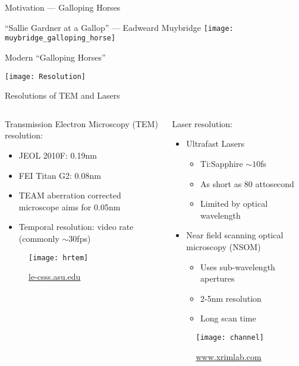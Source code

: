 \begin{frame}{Motivation --- Galloping Horses}
  \begin{center}
    ``Sallie Gardner at a Gallop'' --- Eadweard Muybridge
    \texttt{[image: muybridge\_galloping\_horse]}
  \end{center}
\end{frame}

\begin{frame}{Modern ``Galloping Horses''}
  \begin{center}
    \texttt{[image: Resolution]}
  \end{center}
\end{frame}

\begin{frame}{Resolutions of TEM and Lasers}
  \begin{columns}	
    \begin{column}{0.49\linewidth}
      Transmission Electron Microscopy (TEM) resolution:
      \begin{itemize}
        \item<2-> JEOL 2010F: 0.19nm
        \item<3-> FEI Titan G2: 0.08nm
        \item<4-> TEAM aberration corrected microscope aims for 0.05nm
        \item<5-> Temporal resolution: video rate (commonly $\sim$30fps)
      \end{itemize}
      \begin{figure}
        \centering
        \texttt{[image: hrtem]}
        \caption{\url{le-csss.asu.edu}}
      \end{figure}
    \end{column}
    \begin{column}{0.49\linewidth}
      Laser resolution:
      \begin{itemize}
        \item<6-> Ultrafast Lasers
        \begin{itemize}
          \item<7-> Ti:Sapphire $\sim 10$fs 
          \item<8-> As short as 80 attosecond
          \item<9-> Limited by optical wavelength
        \end{itemize}
        \item<10-> Near field scanning optical microscopy (NSOM)
        \begin{itemize}
          \item<10-> Uses sub-wavelength apertures
          \item<10-> 2-5nm resolution
          \item<10-> Long scan time
        \end{itemize}
      \end{itemize}
      \begin{figure}
        \centering
        \texttt{[image: channel]}
        \caption{\url{www.xrimlab.com}}
      \end{figure}
    \end{column}
  \end{columns}
\end{frame}

